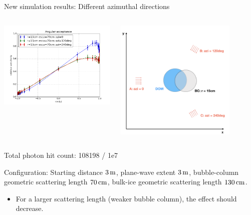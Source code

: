 \begin{frame}[fragile]{New simulation results: Different azimuthal directions}
  \begin{columns}
    \begin{column}{0.5\textwidth}
      \includegraphics[width=\textwidth]{img/summer_scenario_r15cm_esca70cm}
    \end{column}
    \begin{column}{0.5\textwidth}
      \includegraphics[width=0.8\textwidth]{img/summerscenario-004}
    \end{column}
  \end{columns}

  \tiny Total photon hit count: 108198 / 1e7

  \tiny Configuration: Starting distance $3\text{\,m}$, plane-wave extent $3\text{\,m}$, bubble-column geometric scattering length $70\text{\,cm}$, bulk-ice geometric scattering length $130\text{\,cm}$.
  \normalsize

  \begin{itemize}
    \item For a larger scattering length (weaker bubble column), the effect should decrease. \checkmark
  \end{itemize}
\end{frame}

